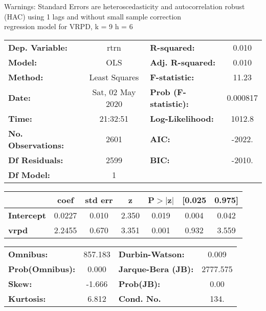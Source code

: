 Warnings: \newline
 [1] Standard Errors are heteroscedasticity and autocorrelation robust (HAC) using 1 lags and without small sample correction\\ 

regression model for VRPD, k = 9 h = 6\begin{center}
\begin{tabular}{lclc}
\toprule
\textbf{Dep. Variable:}    &       rtrn       & \textbf{  R-squared:         } &     0.010   \\
\textbf{Model:}            &       OLS        & \textbf{  Adj. R-squared:    } &     0.010   \\
\textbf{Method:}           &  Least Squares   & \textbf{  F-statistic:       } &     11.23   \\
\textbf{Date:}             & Sat, 02 May 2020 & \textbf{  Prob (F-statistic):} &  0.000817   \\
\textbf{Time:}             &     21:32:51     & \textbf{  Log-Likelihood:    } &    1012.8   \\
\textbf{No. Observations:} &        2601      & \textbf{  AIC:               } &    -2022.   \\
\textbf{Df Residuals:}     &        2599      & \textbf{  BIC:               } &    -2010.   \\
\textbf{Df Model:}         &           1      & \textbf{                     } &             \\
\bottomrule
\end{tabular}
\begin{tabular}{lcccccc}
                   & \textbf{coef} & \textbf{std err} & \textbf{z} & \textbf{P$> |$z$|$} & \textbf{[0.025} & \textbf{0.975]}  \\
\midrule
\textbf{Intercept} &       0.0227  &        0.010     &     2.350  &         0.019        &        0.004    &        0.042     \\
\textbf{vrpd}      &       2.2455  &        0.670     &     3.351  &         0.001        &        0.932    &        3.559     \\
\bottomrule
\end{tabular}
\begin{tabular}{lclc}
\textbf{Omnibus:}       & 857.183 & \textbf{  Durbin-Watson:     } &    0.009  \\
\textbf{Prob(Omnibus):} &   0.000 & \textbf{  Jarque-Bera (JB):  } & 2777.575  \\
\textbf{Skew:}          &  -1.666 & \textbf{  Prob(JB):          } &     0.00  \\
\textbf{Kurtosis:}      &   6.812 & \textbf{  Cond. No.          } &     134.  \\
\bottomrule
\end{tabular}
\end{center}

